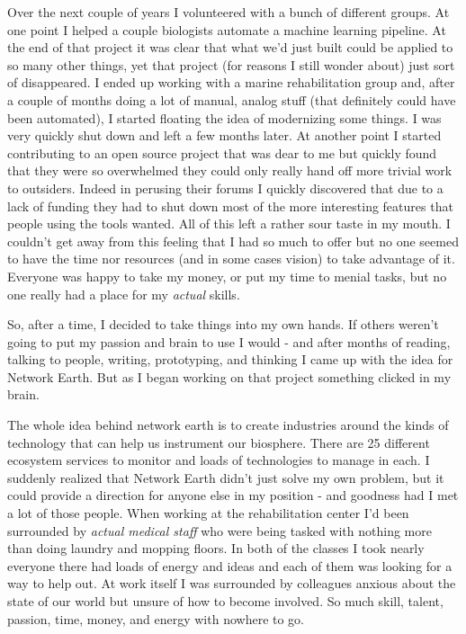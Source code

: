 \documentclass[11pt,a5paper]{book}
\begin{document}
Over the next couple of years I volunteered with a bunch of different groups. At one point I helped a couple biologists automate a machine learning pipeline. At the end of that project it was clear that what we'd just built could be applied to so many other things, yet that project (for reasons I still wonder about) just sort of disappeared. I ended up working with a marine rehabilitation group and, after a couple of months doing a lot of manual, analog stuff (that definitely could have been automated), I started floating the idea of modernizing some things. I was very quickly shut down and left a few months later. At another point I started contributing to an open source project that was dear to me but quickly found that they were so overwhelmed they could only really hand off  more trivial work to outsiders. Indeed in perusing their forums I quickly discovered that due to a lack of funding they had to shut down most of the more interesting features that people using the tools wanted. All of this left a rather sour taste in my mouth. I couldn't get away from this feeling that I had so much to offer but no one seemed to have the time nor resources (and in some cases vision) to take advantage of it. Everyone was happy to take my money, or put my time to menial tasks, but no one really had a place for my \textit{actual} skills.
\newline

So, after a time, I decided to take things into my own hands. If others weren't going to put my passion and brain to use I would - and after months of reading, talking to people, writing, prototyping, and thinking I came up with the idea for Network Earth. But as I began working on that project something clicked in my brain. 
\newline

The whole idea behind network earth is to create industries around the kinds of technology that can help us instrument our biosphere. There are 25 different ecosystem services to monitor and loads of technologies to manage in each. I suddenly realized that Network Earth didn't just solve my own problem, but it could provide a direction for anyone else in my position - and goodness had I met a lot of those people. When working at the rehabilitation center I'd been surrounded by \textit{actual medical staff} who were being tasked with nothing more than doing laundry and mopping floors. In both of the classes I took nearly everyone there had loads of energy and ideas and each of them was looking for a way to help out. At work itself I was surrounded by colleagues anxious about the state of our world but unsure of how to become involved. So much skill, talent, passion, time, money, and energy with nowhere to go. 
\newline
\end{document}
